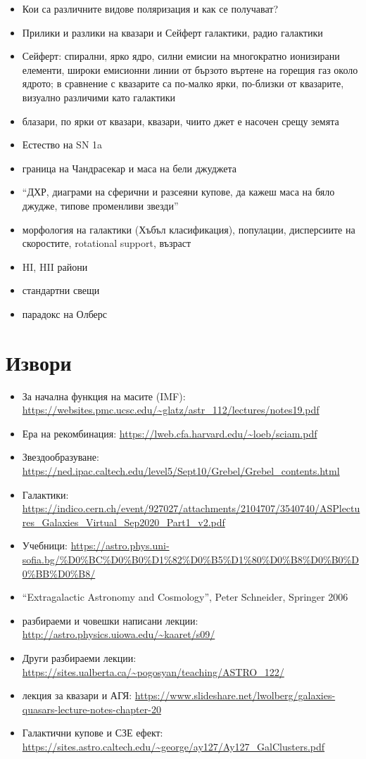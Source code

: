 \documentclass[a4paper,12pt]{article}
\begin{document}
\begin{itemize}
\item Кои са различните видове поляризация и как се получават?
\item  Прилики и разлики на квазари и Сейферт галактики, радио галактики
\item  Сейферт: спирални, ярко ядро, силни емисии на многократно ионизирани елементи, широки емисионни линии от бързото въртене на горещия газ около ядрото; в сравнение с квазарите са по-малко ярки, по-близки от квазарите, визуално различими като галактики
\item блазари, по ярки от квазари, квазари, чиито джет е насочен срещу земята
\item  Естество на SN 1a
\item  граница на Чандрасекар и маса на бели джуджета
\item  ``ДХР, диаграми на сферични и разсеяни купове, да кажеш маса на бяло джудже, типове променливи звезди''
\item  морфология на галактики (Хъбъл класификация), популации, дисперсиите на скоростите, rotational support, възраст
\item  HI, HII райони
\item  стандартни свещи
\item  парадокс на Олберс
\end{itemize}


\section*{Извори}

\begin{itemize}
\item За начална функция на масите (IMF): \url{https://websites.pmc.ucsc.edu/~glatz/astr_112/lectures/notes19.pdf}
\item Ера на рекомбинация: \url{https://lweb.cfa.harvard.edu/~loeb/sciam.pdf}
\item Звездообразуване: \url{https://ned.ipac.caltech.edu/level5/Sept10/Grebel/Grebel_contents.html}
\item Галактики: \url{https://indico.cern.ch/event/927027/attachments/2104707/3540740/ASPlectures_Galaxies_Virtual_Sep2020_Part1_v2.pdf}
\item Учебници: \url{https://astro.phys.uni-sofia.bg/%D0%BC%D0%B0%D1%82%D0%B5%D1%80%D0%B8%D0%B0%D0%BB%D0%B8/}
\item ``Extragalactic Astronomy and Cosmology'', Peter Schneider, Springer 2006
\item разбираеми и човешки написани лекции: \url{http://astro.physics.uiowa.edu/~kaaret/s09/}
\item Други разбираеми лекции: \url{https://sites.ualberta.ca/~pogosyan/teaching/ASTRO_122/}
\item лекция за квазари и АГЯ: \url{https://www.slideshare.net/lwolberg/galaxies-quasars-lecture-notes-chapter-20}
\item Галактични купове и СЗЕ ефект: \url{https://sites.astro.caltech.edu/~george/ay127/Ay127_GalClusters.pdf}
\end{itemize}
\end{document}
